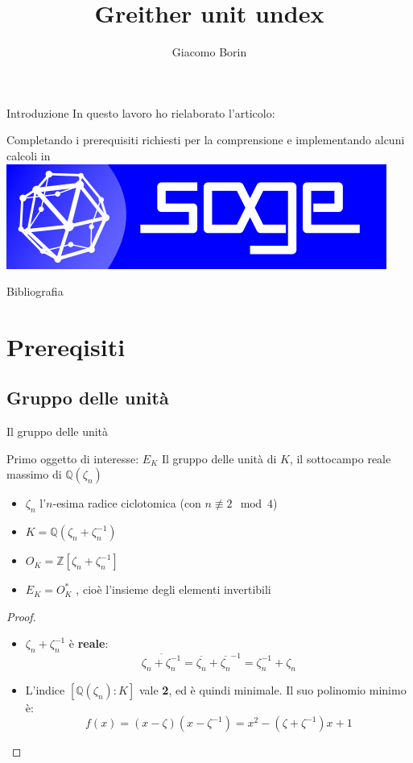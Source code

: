 \documentclass{beamer}
\title{Greither unit undex}
\author{Giacomo Borin}
\institute{Dipartimento di Matematica}
\newcommand{\mybibexclude}[1]{\addtocategory{fullcited}{#1}}
\theoremstyle{plain}
\theoremstyle{remark}
\theoremstyle{definition}
\newcommand{\sage}{\href{https://www.sagemath.org}{\includegraphics[height=\fontcharht\font`\B]{images/sage.png} }}
\newcommand{\noqed}{\let\qed\relax}
\newcommand{\Z}{\mathbb{Z}}
\newcommand{\Q}{\mathbb{Q}}
\begin{document}
	\begin{frame}[plain]
	    \maketitle
	\end{frame}
	
	\begin{frame}{Introduzione}
		In questo lavoro ho rielaborato l'articolo:
		\begin{exampleblock}{}
			 \mybibexclude{GRE}
		\end{exampleblock}	
		\pause
		Completando i prerequisiti richiesti per la comprensione e implementando alcuni calcoli in \sage
	\end{frame}
	
	\begin{frame}[allowframebreaks]{Bibliografia}
			\printbibliography[heading=none, notcategory=fullcited]
	\end{frame}
	

	
\section{Prereqisiti}
\subsection{Gruppo delle unità}
	\begin{frame}{Il gruppo delle unità}
		\begin{block}{Primo oggetto di interesse: $ E_K $}
			Il gruppo delle unità di $ K $, il sottocampo reale massimo di $ \Q (\zeta_n )  $
		\end{block}
		\pause
		\begin{itemize}
			\item $ \zeta_n $  l'$ n $-esima radice ciclotomica (con $ n \not \equiv 2 \mod 4 $) \pause
			\item $ K = \Q (\zeta_n + \zeta_n^{-1})$ \pause
			\item $ O_K = \Z[\zeta_n + \zeta_n^{-1}] $ \pause
			\item $ E_K = O _K ^\ast$ , cioè l'insieme degli elementi invertibili 
		\end{itemize}
		\hyperlink{skip1}{ }
	\end{frame}
	
	\begin{frame}
		\begin{proof} \noqed
			\begin{itemize}
			\item $  \zeta_n + \zeta_n^{-1}  $ è \textbf{reale}:
			\[ \overline{\zeta_n + \zeta_n^{-1}} = \overline{\zeta_n} + \overline{\zeta_n}^{-1} = \zeta_n^{-1} + \zeta_n \] \pause
			\item L'indice $ [\Q(\zeta_n) : K] $ vale \textbf{2}, ed è quindi minimale. \pause 
			Il suo polinomio minimo è: 
			\[ f(x) = (x-\zeta)(x- \zeta^{-1}) = x^2 - (\zeta + \zeta ^{-1})x +1   \]
			\end{itemize}
		\end{proof}
	\end{frame}
	
\end{document}
